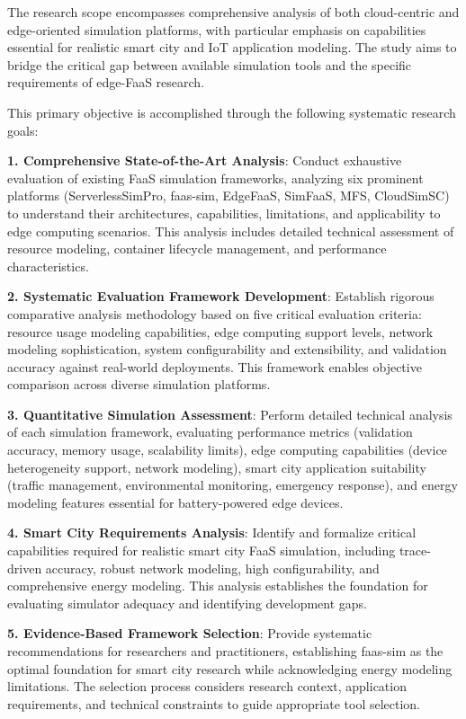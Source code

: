 The research scope encompasses comprehensive analysis of both cloud-centric and edge-oriented simulation platforms, with particular emphasis on capabilities essential for realistic smart city and IoT application modeling. The study aims to bridge the critical gap between available simulation tools and the specific requirements of edge-FaaS research.

This primary objective is accomplished through the following systematic research goals:

\textbf{1. Comprehensive State-of-the-Art Analysis}: Conduct exhaustive evaluation of existing FaaS simulation frameworks, analyzing six prominent platforms (ServerlessSimPro, faas-sim, EdgeFaaS, SimFaaS, MFS, CloudSimSC) to understand their architectures, capabilities, limitations, and applicability to edge computing scenarios. This analysis includes detailed technical assessment of resource modeling, container lifecycle management, and performance characteristics.

\textbf{2. Systematic Evaluation Framework Development}: Establish rigorous comparative analysis methodology based on five critical evaluation criteria: resource usage modeling capabilities, edge computing support levels, network modeling sophistication, system configurability and extensibility, and validation accuracy against real-world deployments. This framework enables objective comparison across diverse simulation platforms.

\textbf{3. Quantitative Simulation Assessment}: Perform detailed technical analysis of each simulation framework, evaluating performance metrics (validation accuracy, memory usage, scalability limits), edge computing capabilities (device heterogeneity support, network modeling), smart city application suitability (traffic management, environmental monitoring, emergency response), and energy modeling features essential for battery-powered edge devices.

\textbf{4. Smart City Requirements Analysis}: Identify and formalize critical capabilities required for realistic smart city FaaS simulation, including trace-driven accuracy, robust network modeling, high configurability, and comprehensive energy modeling. This analysis establishes the foundation for evaluating simulator adequacy and identifying development gaps.

\textbf{5. Evidence-Based Framework Selection}: Provide systematic recommendations for researchers and practitioners, establishing faas-sim as the optimal foundation for smart city research while acknowledging energy modeling limitations. The selection process considers research context, application requirements, and technical constraints to guide appropriate tool selection.

